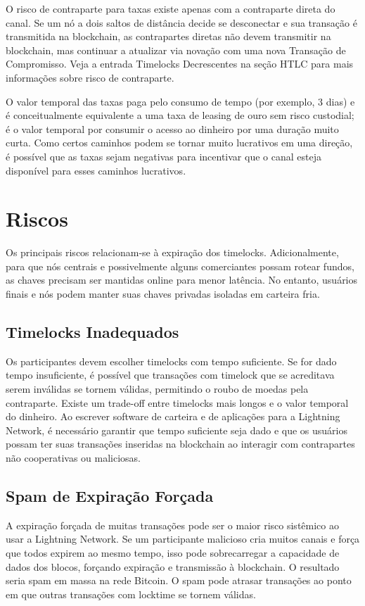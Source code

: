 \documentclass[letterpaper,11pt]{article}
\begin{document}
O risco de contraparte para taxas existe apenas com a contraparte direta
do canal. Se um nó a dois saltos de distância decide se desconectar e sua
transação é transmitida na blockchain, as contrapartes diretas não devem
transmitir na blockchain, mas continuar a atualizar via novação com uma
nova Transação de Compromisso. Veja a entrada Timelocks Decrescentes na
seção HTLC para mais informações sobre risco de contraparte.

O valor temporal das taxas paga pelo consumo de tempo (por exemplo, 3
dias) e é conceitualmente equivalente a uma taxa de leasing de ouro sem
risco custodial; é o valor temporal por consumir o acesso ao dinheiro por
uma duração muito curta. Como certos caminhos podem se tornar muito
lucrativos em uma direção, é possível que as taxas sejam negativas para
incentivar que o canal esteja disponível para esses caminhos lucrativos.

\section{Riscos}

Os principais riscos relacionam-se à expiração dos timelocks. Adicionalmente,
para que nós centrais e possivelmente alguns comerciantes possam rotear
fundos, as chaves precisam ser mantidas online para menor latência. No
entanto, usuários finais e nós podem manter suas chaves privadas isoladas em
carteira fria.

\subsection{Timelocks Inadequados}

Os participantes devem escolher timelocks com tempo suficiente. Se for dado
tempo insuficiente, é possível que transações com timelock que se acreditava
serem inválidas se tornem válidas, permitindo o roubo de moedas pela
contraparte. Existe um trade-off entre timelocks mais longos e o valor
temporal do dinheiro. Ao escrever software de carteira e de aplicações para
a Lightning Network, é necessário garantir que tempo suficiente seja dado e
que os usuários possam ter suas transações inseridas na blockchain ao
interagir com contrapartes não cooperativas ou maliciosas.

\subsection{Spam de Expiração Forçada}

A expiração forçada de muitas transações pode ser o maior risco sistêmico ao
usar a Lightning Network. Se um participante malicioso cria muitos canais e
força que todos expirem ao mesmo tempo, isso pode sobrecarregar a capacidade
de dados dos blocos, forçando expiração e transmissão à blockchain. O
resultado seria spam em massa na rede Bitcoin. O spam pode atrasar
transações ao ponto em que outras transações com locktime se tornem
válidas.
\end{document}
